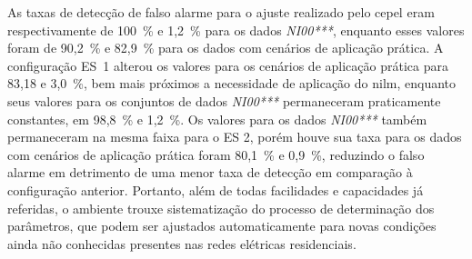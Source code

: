 As taxas de detecção de falso alarme para o ajuste realizado pelo
\acs{cepel} eram respectivamente de 100~\% e 1,2~\% para os dados
\emph{NI00***}, enquanto esses valores foram de 90,2~\% e 82,9~\% para
os dados com cenários de aplicação prática. A configuração ES~1
alterou os valores para os cenários de aplicação prática para 83,18 e
3,0~\%, bem mais próximos a necessidade de aplicação do \acs{nilm},
enquanto seus valores para os conjuntos de dados \emph{NI00***}
permaneceram praticamente constantes, em 98,8~\% e 1,2~\%. Os valores
para os dados \emph{NI00***} também permaneceram na mesma faixa para
o ES 2, porém houve sua taxa para os dados com cenários de aplicação
prática foram 80,1~\% e 0,9~\%, reduzindo o falso alarme em detrimento
de uma menor taxa de detecção em comparação à configuração anterior.
Portanto, além de todas facilidades e capacidades já referidas, o
ambiente trouxe sistematização do processo de determinação dos
parâmetros, que podem ser ajustados automaticamente para novas
condições ainda não conhecidas presentes nas redes elétricas
residenciais.

%


